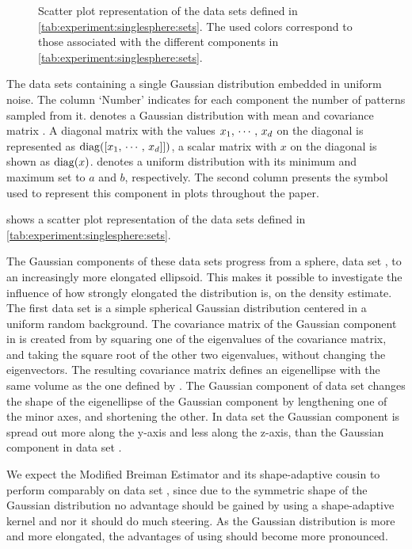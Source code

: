 
\begin{figure*}
	\centering
	
	\caption{Scatter plot representation of the data sets defined in \cref{tab:experiment:singlesphere:sets}. The used colors correspond to those associated with the different components in \cref{tab:experiment:singlesphere:sets}.}
	\label{fig:experiment:singlesphere:sets}
\end{figure*}

\begin{table*}
	\centering
	
	\caption{The data sets containing a single Gaussian distribution embedded in uniform noise. The column `Number' indicates for each component the number of patterns sampled from it. \gaussDist{\varMean}{\varCovarianceMatrix} denotes a Gaussian distribution with mean \varMean and covariance matrix \varCovarianceMatrix. A diagonal matrix with the values $x_1,\, \cdots,\, x_d$ on the diagonal is represented as $\operatorname{diag}([x_1,\,\cdots,\,x_d]])$, a scalar matrix with $x$ on the diagonal is shown as $\operatorname{diag}(x)$.  denotes a uniform distribution with its minimum and maximum set to $a$ and $b$, respectively. The second column presents the symbol used to represent this component in plots throughout the paper.} 	
	\label{tab:experiment:singlesphere:sets}
\end{table*}

 shows a scatter plot representation of the data sets defined in \cref{tab:experiment:singlesphere:sets}. 

The Gaussian components of these data sets progress from a sphere, \ie data set \ferdosiOne, to an increasingly more elongated ellipsoid. This makes it possible to investigate the influence of how strongly elongated the distribution is, on the density estimate. 
	The first data set is a simple spherical Gaussian distribution centered in a uniform random background. 
	The covariance matrix of the Gaussian component in \baakmanOne is created from \ferdosiOne by squaring one of the eigenvalues of the covariance matrix, and taking the square root of the other two eigenvalues, without changing the eigenvectors. The resulting covariance matrix defines an eigenellipse with the same volume as the one defined by \ferdosiOne.
	The Gaussian component of data set \baakmanFour changes the shape of the eigenellipse of the Gaussian component by lengthening one of the minor axes, and shortening the other.
	In data set \baakmanFive the Gaussian component is spread out more along the y-axis and less along the z-axis, than the Gaussian component in data set \baakmanFour.

	We expect the Modified Breiman Estimator and its shape-adaptive cousin to perform comparably on data set \ferdosiOne, since due to the symmetric shape of the Gaussian distribution no advantage should be gained by using a shape-adaptive kernel and nor it should do much steering. 
	As the Gaussian distribution is more and more elongated, the advantages of using \sambe should become more pronounced. 